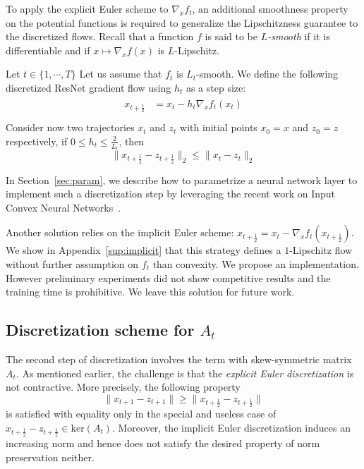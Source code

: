To apply the explicit Euler scheme to $\nabla_x f_t$, an  additional smoothness property on the potential functions is required  to generalize the Lipschitzness guarantee to the discretized flows. Recall that a function $f$ is said to be \emph{$L$-smooth} if it is differentiable and if $x\mapsto\nabla_x f(x)$ is $L$-Lipschitz. 
\begin{prop}\label{prop:discrete_convex_potentials}
Let $t\in\{1,\cdots,T\}$ Let us assume that $f_{t}$ is $L_t$-smooth. We  define the following discretized ResNet gradient flow using $h_t$ as a step size:
\begin{align*}
    \begin{array}{ll}
    x_{t+\frac12} &= x_{t}-h_{t}\nabla_xf_{t}(x_{t})\\
  \end{array}
 \end{align*}
Consider now two trajectories $x_t$ and $z_t$ with initial points $x_0=x$ and $z_0=z$ respectively,  if $0\leq h_t\leq \frac{2}{L_t}$,  then 
$$\lVert x_{t+\frac12}-z_{t+\frac12}\rVert_2\leq \lVert x_t-z_t\rVert_2$$
\end{prop}
In Section~\ref{sec:param}, we describe how to parametrize a neural network layer to implement such a discretization step by leveraging the recent work on Input Convex Neural Networks~\cite{amos2017input}. 

\begin{rmq}
Another solution relies on the implicit Euler scheme: $ x_{t+\frac12} = x_{t}-\nabla_xf_{t}(x_{t+\frac12})$. We show in Appendix~\ref{sup:implicit} that this strategy defines a $1$-Lipschitz flow without further assumption on $f_t$ than convexity. We propose an implementation. However preliminary experiments did not show competitive results and the training time is prohibitive. We leave this solution for future work. 

\end{rmq}
\subsection{Discretization scheme for $A_t$}

The second step of discretization involves the term with skew-symmetric matrix $A_t$. As mentioned earlier, the challenge is that the \emph{explicit Euler discretization} is not contractive. More precisely,  the following property 
$$\lVert x_{t+1} - z_{t+1}\rVert\geq \lVert x_{t+\frac12} - z_{t+\frac12}\rVert$$ 
is satisfied with equality only in the special and useless case of $x_{t+\frac12} - z_{t+\frac12} \in \text{ker}(A_t)$. Moreover, the implicit Euler discretization induces an increasing norm and hence does not satisfy the desired property of norm preservation neither. 

